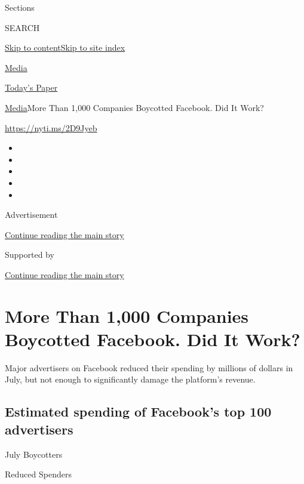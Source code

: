 Sections

SEARCH

\protect\hyperlink{site-content}{Skip to
content}\protect\hyperlink{site-index}{Skip to site index}

\href{https://www.nytimes3xbfgragh.onion/section/business/media}{Media}

\href{https://myaccount.nytimes3xbfgragh.onion/auth/login?response_type=cookie\&client_id=vi}{}

\href{https://www.nytimes3xbfgragh.onion/section/todayspaper}{Today's
Paper}

\href{/section/business/media}{Media}\textbar{}More Than 1,000 Companies
Boycotted Facebook. Did It Work?

\url{https://nyti.ms/2D9Jyeb}

\begin{itemize}
\item
\item
\item
\item
\item
\end{itemize}

Advertisement

\protect\hyperlink{after-top}{Continue reading the main story}

Supported by

\protect\hyperlink{after-sponsor}{Continue reading the main story}

\hypertarget{more-than-1000-companies-boycotted-facebook-did-it-work}{%
\section{More Than 1,000 Companies Boycotted Facebook. Did It
Work?}\label{more-than-1000-companies-boycotted-facebook-did-it-work}}

Major advertisers on Facebook reduced their spending by millions of
dollars in July, but not enough to significantly damage the platform's
revenue.

\hypertarget{estimated-spending-of-facebooks-top-100-advertisers}{%
\subsection{Estimated spending of Facebook's top 100
advertisers}\label{estimated-spending-of-facebooks-top-100-advertisers}}

July Boycotters

Reduced Spenders

